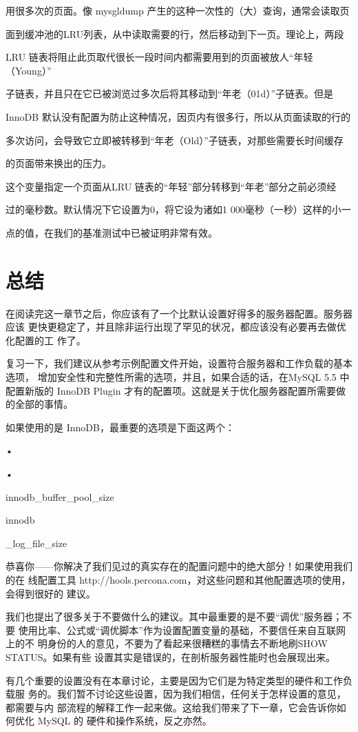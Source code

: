 用很多次的页面。像 mysgldump 产生的这种一次性的（大）查询，通常会读取页

面到缓冲池的LRU列表，从中读取需要的行，然后移动到下一页。理论上，两段

LRU 链表将阻止此页取代很长一段时间内都需要用到的页面被放人“年轻（Young）”

子链表，并且只在它已被浏览过多次后将其移动到“年老（01d）”子链表。但是

InnoDB 默认没有配置为防止这种情况，因页内有很多行，所以从页面读取的行的

多次访问，会导致它立即被转移到“年老（Old）”子链表，对那些需要长时间缓存

的页面带来换出的压力。

这个变量指定一个页面从LRU 链表的“年轻”部分转移到“年老”部分之前必须经

过的毫秒数。默认情况下它设置为0，将它设为诸如1 000毫秒（一秒）这样的小一

点的值，在我们的基准测试中已被证明非常有效。

\section{总结}
在阅读完这一章节之后，你应该有了一个比默认设置好得多的服务器配置。服务器应该
更快更稳定了，并且除非运行出现了罕见的状况，都应该没有必要再去做优化配置的工
作了。

复习一下，我们建议从参考示例配置文件开始，设置符合服务器和工作负载的基本选项，
增加安全性和完整性所需的选项，并且，如果合适的话，在MySQL 5.5 中配置新版的
InnoDB Plugin 才有的配置项。这就是关于优化服务器配置所需要做的全部的事情。

如果使用的是 InnoDB，最重要的选项是下面这两个：

•

•

innodb\_buffer\_pool\_size

innodb

\_log\_file\_size

恭喜你——你解决了我们见过的真实存在的配置问题中的绝大部分！如果使用我们的在
线配置工具 http://hools.percona.com，对这些问题和其他配置选项的使用，会得到很好的
建议。

我们也提出了很多关于不要做什么的建议。其中最重要的是不要“调优”服务器；不要
使用比率、公式或“调优脚本”作为设置配置变量的基础，不要信任来自互联网上的不
明身份的人的意见，不要为了看起来很糟糕的事情去不断地刷SHOW STATUS。如果有些
设置其实是错误的，在剖析服务器性能时也会展现出来。

有几个重要的设置没有在本章讨论，主要是因为它们是为特定类型的硬件和工作负载服
务的。我们暂不讨论这些设置，因为我们相信，任何关于怎样设置的意见，都需要与内
部流程的解释工作一起来做。这给我们带来了下一章，它会告诉你如何优化 MySQL 的
硬件和操作系统，反之亦然。


